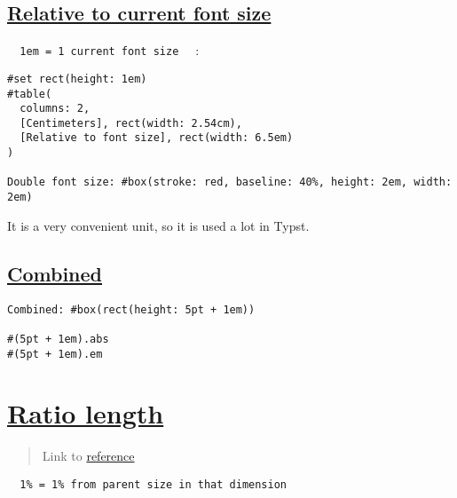 \pandocbounded{}

\subsection{\texorpdfstring{\hyperref[relative-to-current-font-size]{Relative
to current font
size}}{Relative to current font size}}\label{relative-to-current-font-size}

\texttt{\ }{\texttt{\ 1em\ =\ 1\ current\ font\ size\ }}\texttt{\ } :

\begin{verbatim}
#set rect(height: 1em)
#table(
  columns: 2,
  [Centimeters], rect(width: 2.54cm),
  [Relative to font size], rect(width: 6.5em)
)

Double font size: #box(stroke: red, baseline: 40%, height: 2em, width: 2em)
\end{verbatim}

\pandocbounded{}

It is a very convenient unit, so it is used a lot in Typst.

\subsection{\texorpdfstring{\hyperref[combined]{Combined}}{Combined}}\label{combined}

\begin{verbatim}
Combined: #box(rect(height: 5pt + 1em))

#(5pt + 1em).abs
#(5pt + 1em).em
\end{verbatim}

\pandocbounded{}

\section{\texorpdfstring{\hyperref[ratio-length]{Ratio
length}}{Ratio length}}\label{ratio-length}

\begin{quote}
Link to \href{https://typst.app/docs/reference/layout/ratio/}{reference}
\end{quote}

\texttt{\ }{\texttt{\ 1\%\ =\ 1\%\ from\ parent\ size\ in\ that\ dimension\ }}\texttt{\ }

